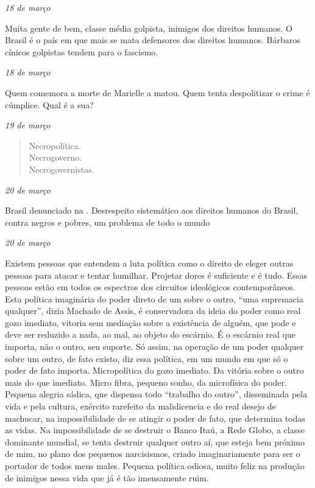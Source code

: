 \begin{flushright}
\emph{18 de março}
\end{flushright}

Muita gente de bem, classe média golpista, inimigos dos direitos
humanos. O Brasil é o país em que mais se mata defensores dos direitos
humanos. Bárbaros cínicos golpistas tendem para o fascismo.

\begin{flushright}
\emph{18 de março}
\end{flushright}

Quem comemora a morte de Marielle a matou. Quem tenta despolitizar o
crime é cúmplice. Qual é a sua?

\pagebreak

\begin{flushright}
\emph{19 de março}
\end{flushright}

\begin{verse}
Necropolítica. \\
Necrogoverno. \\
Necrogovernistas. \\
\end{verse}

\begin{flushright}
\emph{20 de março}
\end{flushright}

Brasil denunciado na . Desrespeito sistemático aos direitos humanos
do Brasil, contra negros e pobres, um problema de todo o mundo

\begin{flushright}
\emph{20 de março}
\end{flushright}

Existem pessoas que entendem a luta política como o direito de eleger
outras pessoas para atacar e tentar humilhar. Projetar dores é
suficiente e é tudo. Essas pessoas estão em todos os espectros dos
circuitos ideológicos contemporâneos. Esta política imaginária do poder
direto de um sobre o outro, ``uma supremacia qualquer'', dizia Machado
de Assis, é conservadora da ideia do poder como real gozo imediato,
vitoria sem mediação sobre a existência de alguém, que pode e deve ser
reduzido a nada, ao mal, ao objeto do escárnio. É o escárnio real que
importa, não o outro, seu suporte. Só assim, na operação de um poder
qualquer sobre um outro, de fato existo, diz essa política, em um mundo
em que só o poder de fato importa. Micropolítica do gozo imediato. Da
vitória sobre o outro mais do que imediato. Micro fibra, pequeno sonho,
da microfísica do poder. Pequena alegria sádica, que dispensa todo
``trabalho do outro'', disseminada pela vida e pela cultura, exército
rarefeito da malidicencia e do real desejo de machucar, na
impossibilidade de se atingir o poder de fato, que determina todas as
vidas. Na impossibilidade de se destruir o Banco Itaú, a Rede Globo, a
classe dominante mundial, se tenta destruir qualquer outro aí, que
esteja bem próximo de mim, no plano dos pequenos narcisismos, criado
imaginariamente para ser o portador de todos meus males. Pequena
política odiosa, muito feliz na produção de inimigos nessa vida que já é
tão imensamente ruim.

